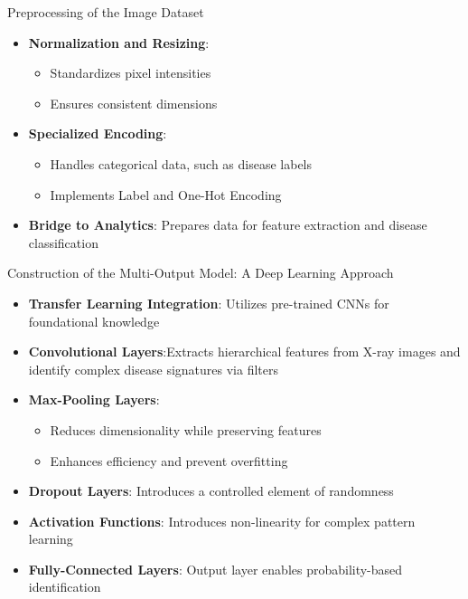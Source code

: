 \documentclass{beamer}
\begin{document}
\begin{frame}{Preprocessing of the Image Dataset}
	\begin{itemize}
		\vfill
		\item \textbf{Normalization and Resizing}:
		\begin{itemize}
			\item Standardizes pixel intensities
			\item Ensures consistent dimensions
		\end{itemize}
		\vfill
		\item \textbf{Specialized Encoding}:
		\begin{itemize}
			\item Handles categorical data, such as disease labels
			\item Implements Label and One-Hot Encoding
		\end{itemize}
		\vfill
		\item \textbf{Bridge to Analytics}: Prepares data for feature extraction and disease classification
	\end{itemize}
\end{frame}

\begin{frame}{Construction of the Multi-Output Model: A Deep Learning Approach}
	\begin{itemize}
		\vfill
		\item \textbf{Transfer Learning Integration}: Utilizes pre-trained CNNs for foundational knowledge
		\vfill
		\item \textbf{Convolutional Layers}:Extracts hierarchical features from X-ray images and identify complex disease signatures via filters
		\vfill
		\item \textbf{Max-Pooling Layers}:
		\begin{itemize}
			\item Reduces dimensionality while preserving features
			\item Enhances efficiency and prevent overfitting
		\end{itemize} 
		\vfill
		\item \textbf{Dropout Layers}: Introduces a controlled element of randomness
		\vfill
		\item \textbf{Activation Functions}: Introduces non-linearity for complex pattern learning
		\vfill
		\item \textbf{Fully-Connected Layers}: Output layer enables probability-based identification
	\end{itemize}
\end{frame}
\end{document}
